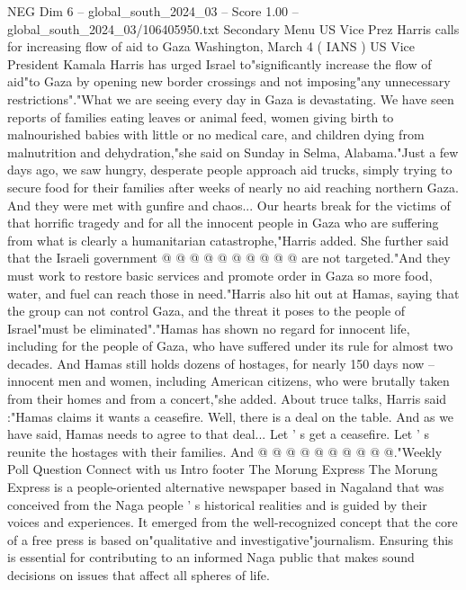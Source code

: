 \begin{textsample}{NEG Dim 6 – global\_south\_2024\_03 – Score 1.00 – global\_south\_2024\_03/106405950.txt}  \label{ex:f6_neg_415}
Secondary Menu US Vice Prez Harris calls for increasing flow of aid to Gaza Washington, March 4 ( IANS ) US Vice President Kamala Harris has urged Israel to"significantly increase the flow of aid"to Gaza by opening new border crossings and not imposing"any unnecessary restrictions"."What we are seeing every day in Gaza is devastating.
We have seen reports of families eating leaves or animal feed, women giving birth to malnourished babies with little or no medical care, and children dying from malnutrition and dehydration,"she said on Sunday in Selma, Alabama."Just a few days ago, we saw hungry, desperate people approach aid trucks, simply trying to secure food for their families after weeks of nearly no aid reaching northern Gaza.
And they were met with gunfire and chaos...
Our hearts break for the victims of that horrific tragedy and for all the innocent people in Gaza who are suffering from what is clearly a humanitarian catastrophe,"Harris added.
She further said that the Israeli government @ @ @ @ @ @ @ @ @ @ are not targeted."And they must work to restore basic services and promote order in Gaza so more food, water, and fuel can reach those in need."Harris also hit out at Hamas, saying that the group can not control Gaza, and the threat it poses to the people of Israel"must be eliminated"."Hamas has shown no regard for innocent life, including for the people of Gaza, who have suffered under its rule for almost two decades.
And Hamas still holds dozens of hostages, for nearly 150 days now -- innocent men and women, including American citizens, who were brutally taken from their homes and from a concert,"she added.
About truce talks, Harris said :"Hamas claims it wants a ceasefire.
Well, there is a deal on the table.
And as we have said, Hamas needs to agree to that deal...
Let ' s get a ceasefire.
Let ' s reunite the hostages with their families.
And @ @ @ @ @ @ @ @ @ @."Weekly Poll Question Connect with us Intro footer The Morung Express The Morung Express is a people-oriented alternative newspaper based in Nagaland that was conceived from the Naga people ' s historical realities and is guided by their voices and experiences.
It emerged from the well-recognized concept that the core of a free press is based on"qualitative and investigative"journalism.
Ensuring this is essential for contributing to an informed Naga public that makes sound decisions on issues that affect all spheres of life.

\end{textsample}

